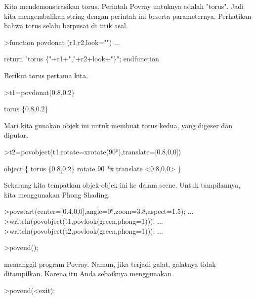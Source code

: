 \documentclass[a4paper,10pt]{article}
\begin{document}
\begin{eulernotebook}
\begin{eulercomment}
Kita mendemonstrasikan torus. Perintah Povray untuknya adalah "torus". Jadi kita mengembalikan string dengan
perintah ini beserta parameternya. Perhatikan bahwa torus selalu berpusat di titik asal.
\end{eulercomment}
\begin{eulerprompt}
>function povdonat (r1,r2,look="") ...
\end{eulerprompt}
\begin{eulerudf}
    return "torus \{"+r1+","+r2+look+"\}";
  endfunction
\end{eulerudf}
\begin{eulercomment}
Berikut torus pertama kita.
\end{eulercomment}
\begin{eulerprompt}
>t1=povdonat(0.8,0.2)
\end{eulerprompt}
\begin{euleroutput}
  torus \{0.8,0.2\}
\end{euleroutput}
\begin{eulercomment}
Mari kita gunakan objek ini untuk membuat torus kedua, yang digeser dan diputar.
\end{eulercomment}
\begin{eulerprompt}
>t2=povobject(t1,rotate=xrotate(90°),translate=[0.8,0,0])
\end{eulerprompt}
\begin{euleroutput}
  object \{ torus \{0.8,0.2\}
   rotate 90 *x 
   translate <0.8,0,0>
   \}
\end{euleroutput}
\begin{eulercomment}
Sekarang kita tempatkan objek-objek ini ke dalam scene. Untuk tampilannya, kita menggunakan Phong Shading.
\end{eulercomment}
\begin{eulerprompt}
>povstart(center=[0.4,0,0],angle=0°,zoom=3.8,aspect=1.5); ...
>writeln(povobject(t1,povlook(green,phong=1))); ...
>writeln(povobject(t2,povlook(green,phong=1))); ...
\end{eulerprompt}
\begin{eulerttcomment}
 >povend();
\end{eulerttcomment}
\begin{eulercomment}
memanggil program Povray. Namun, jika terjadi galat, galatnya tidak ditampilkan. Karena itu Anda sebaiknya
menggunakan

\end{eulercomment}
\begin{eulerttcomment}
 >povend(<exit);
\end{eulerttcomment}
\begin{eulercomment}


\end{eulercomment}
\end{eulernotebook}
\end{document}
